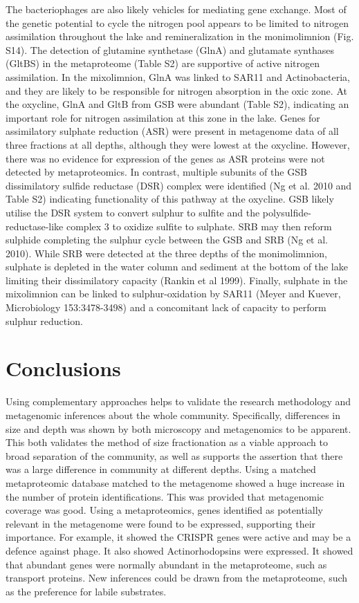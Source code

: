 The bacteriophages are also likely vehicles for mediating gene exchange.
Most of the genetic potential to cycle the nitrogen pool appears to be limited to nitrogen assimilation throughout the lake and remineralization in the monimolimnion (Fig. S14). 
The detection of glutamine synthetase (GlnA) and glutamate synthases (GltBS) in the metaproteome (Table S2) are supportive of active nitrogen assimilation. 
In the mixolimnion, GlnA was linked to SAR11 and Actinobacteria, and they are likely to be responsible for nitrogen absorption in the oxic zone. At the oxycline, GlnA and GltB from GSB were abundant (Table S2), indicating an important role for nitrogen assimilation at this zone in the lake.
Genes for assimilatory sulphate reduction (ASR) were present in metagenome data of all three fractions at all depths, although they were lowest at the oxycline. 
However, there was no evidence for expression of the genes as ASR proteins were not detected by metaproteomics. In contrast, multiple subunits of the GSB dissimilatory sulfide reductase (DSR) complex were identified (Ng et al. 2010 and Table S2) indicating functionality of this pathway at the oxycline. 
\ac{GSB} likely utilise the DSR system to convert sulphur to sulfite and the polysulfide-reductase-like complex 3 to oxidize sulfite to sulphate. 
SRB may then reform sulphide completing the sulphur cycle between the \ac{GSB} and \ac{SRB} (Ng et al. 2010). 
While \ac{SRB} were detected at the three depths of the monimolimnion, sulphate is depleted in the water column and sediment at the bottom of the lake limiting their dissimilatory capacity (Rankin et al 1999). 
Finally, sulphate in the mixolimnion can be linked to sulphur-oxidation by SAR11 (Meyer and Kuever, Microbiology 153:3478-3498) and a concomitant lack of capacity to perform sulphur reduction. 


\section{Conclusions}
Using complementary approaches helps to validate the research methodology and 
metagenomic inferences about the whole community.
Specifically, differences in size and depth was shown by both microscopy and metagenomics to be apparent.
This both validates the method of size fractionation as a viable approach to broad separation of the community,
as well as supports the assertion that there was a large difference in community at different depths.
Using a matched metaproteomic database matched to the metagenome showed a huge increase in the number of protein identifications.
This was provided that metagenomic coverage was good.
Using a metaproteomics, genes identified as potentially relevant in the metagenome were found to be expressed, supporting their importance.
For example, it showed the CRISPR genes were active and may be a defence against phage.
It also showed Actinorhodopsins were expressed.
It showed that abundant genes were normally abundant in the metaproteome, such as transport proteins.
New inferences could be drawn from the metaproteome, such as the preference for labile substrates.



